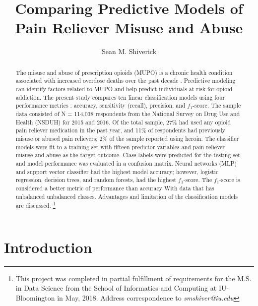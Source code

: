 \documentclass[sigconf]{acmart}
\begin{document}
  \title{Comparing Predictive Models of Pain Reliever Misuse and Abuse}
  \author{Sean M. Shiverick}
\renewcommand{\shortauthors}{S.M. Shiverick}


\begin{abstract}

The misuse and abuse of prescription opioids (MUPO) is a chronic health 
condition associated with increased overdose deaths over the past decade
\cite{nida18}. Predictive modeling can identify factors related to MUPO and 
help predict individuals at risk for opioid addiction. The present study 
compares ten linear classification models using four performance metrics 
: accuracy, sensitivity (recall), precision, and $f_1$-score. The sample 
data consisted of N = 114,038 respondents from the National Survey on Drug 
Use and Health (NSDUH) for 2015 and 2016. Of the total sample, 27\% had 
used any opioid pain reliever medication in the past year, and 11\% of 
respondents had previously misuse or abused pain relievers; 2\% of the 
sample reported using heroin. The classifier models were fit to a training 
set with fifteen predictor variables and pain reliever misuse and abuse as 
the target outcome. Class labels were predicted for the testing set and model 
performance was evaluated in a confusion matrix. Neural networks (MLP) and 
support vector classifier had the highest model accuracy; however, logistic
regression, decision trees, and random forests, had the highest $f_1$-score. 
The $f_1$-score is considered a better metric of performance than accuracy 
With data that has unbalanced unbalanced classes. Advantages and limitation 
of the classification models are discussed. 
\footnote{This project was completed in partial fulfillment of requirements 
for the M.S. in Data Science from the School of Informatics and Computing at 
IU-Bloomington in May, 2018. Address correspondence to \textit{smshiver@iu.edu}}

\end{abstract}
\maketitle

\section{Introduction}
\end{document}
